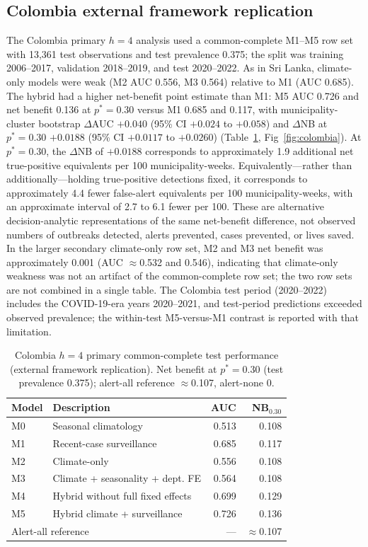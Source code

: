 \documentclass[11pt,a4paper]{article}
\begin{document}
\subsection{Colombia external framework replication}
The Colombia primary $h=4$ analysis used a common-complete M1--M5 row set with 13{,}361 test observations and test prevalence 0.375; the split was training 2006--2017, validation 2018--2019, and test 2020--2022. As in Sri Lanka, climate-only models were weak (M2 AUC 0.556, M3 0.564) relative to M1 (AUC 0.685). The hybrid had a higher net-benefit point estimate than M1: M5 AUC 0.726 and net benefit 0.136 at $p^*=0.30$ versus M1 0.685 and 0.117, with municipality-cluster bootstrap $\Delta$AUC $+0.040$ (95\% CI $+0.024$ to $+0.058$) and $\Delta$NB at $p^*=0.30$ $+0.0188$ (95\% CI $+0.0117$ to $+0.0260$) (Table~\ref{tab:colombia}, Fig~\ref{fig:colombia}). At $p^*=0.30$, the $\Delta$NB of $+0.0188$ corresponds to approximately 1.9 additional net true-positive equivalents per 100 municipality-weeks. Equivalently---rather than additionally---holding true-positive detections fixed, it corresponds to approximately 4.4 fewer false-alert equivalents per 100 municipality-weeks, with an approximate interval of 2.7 to 6.1 fewer per 100. These are alternative decision-analytic representations of the same net-benefit difference, not observed numbers of outbreaks detected, alerts prevented, cases prevented, or lives saved. In the larger secondary climate-only row set, M2 and M3 net benefit was approximately 0.001 (AUC $\approx$0.532 and 0.546), indicating that climate-only weakness was not an artifact of the common-complete row set; the two row sets are not combined in a single table. The Colombia test period (2020--2022) includes the COVID-19-era years 2020--2021, and test-period predictions exceeded observed prevalence; the within-test M5-versus-M1 contrast is reported with that limitation.

\begin{table}[htbp]
\centering
\caption{Colombia $h=4$ primary common-complete test performance (external framework replication). Net benefit at $p^*=0.30$ (test prevalence 0.375); alert-all reference $\approx$0.107, alert-none $0$.}
\label{tab:colombia}
\small
\begin{tabular}{llrr}
\toprule
Model & Description & AUC & NB$_{0.30}$ \\
\midrule
M0 & Seasonal climatology & 0.513 & 0.108 \\
M1 & Recent-case surveillance & 0.685 & 0.117 \\
M2 & Climate-only & 0.556 & 0.108 \\
M3 & Climate + seasonality + dept. FE & 0.564 & 0.108 \\
M4 & Hybrid without full fixed effects & 0.699 & 0.129 \\
M5 & Hybrid climate + surveillance & 0.726 & 0.136 \\
\midrule
\multicolumn{2}{l}{Alert-all reference} & --- & $\approx$0.107 \\
\bottomrule
\end{tabular}
\end{table}
\end{document}
